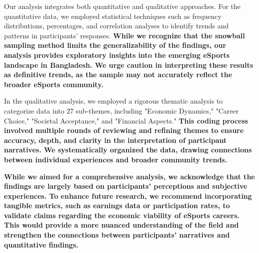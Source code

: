 \documentclass[manuscript,screen,review,anonymous]{acmart}
\begin{document}

Our analysis integrates both quantitative and qualitative approaches. For the quantitative data, we employed statistical techniques such as frequency distributions, percentages, and correlation analyses to identify trends and patterns in participants' responses. \textbf{While we recognize that the snowball sampling method limits the generalizability of the findings, our analysis provides exploratory insights into the emerging eSports landscape in Bangladesh. We urge caution in interpreting these results as definitive trends, as the sample may not accurately reflect the broader eSports community.}

In the qualitative analysis, we employed a rigorous thematic analysis to categorize data into 27 sub-themes, including "Economic Dynamics," "Career Choice," "Societal Acceptance," and "Financial Aspects." \textbf{This coding process involved multiple rounds of reviewing and refining themes to ensure accuracy, depth, and clarity in the interpretation of participant narratives. We systematically organized the data, drawing connections between individual experiences and broader community trends.}

\textbf{While we aimed for a comprehensive analysis, we acknowledge that the findings are largely based on participants' perceptions and subjective experiences. To enhance future research, we recommend incorporating tangible metrics, such as earnings data or participation rates, to validate claims regarding the economic viability of eSports careers. This would provide a more nuanced understanding of the field and strengthen the connections between participants' narratives and quantitative findings.}
\end{document}
